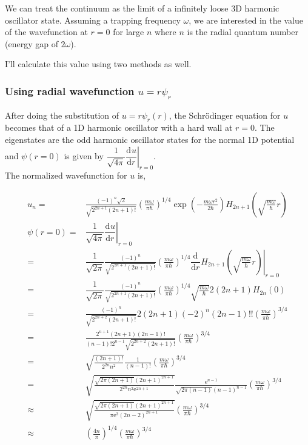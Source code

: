 \documentclass[10pt,fleqn]{article}
\newcommand{\ud}{\mathrm{d}}
\newcommand{\ue}{\mathrm{e}}
\newcommand{\eqar}[1]
{
  \begin{align*}
    #1
  \end{align*}
}
\newcommand{\paren}[1]{{\left({#1}\right)}}
\newcommand{\ddiff}[3][{}]{{\dfrac{\ud^{#1} {#2}}{\ud {#3}{}^{#1}}}}
\begin{document}
We can treat the continuum as the limit of a infinitely loose 3D harmonic oscillator state.
Assuming a trapping frequency $\omega$, we are interested in the value of the wavefunction
at $r=0$ for large $n$ where $n$ is the radial quantum number (energy gap of $2\omega$).

I'll calculate this value using two methods as well.

\subsubsection{Using radial wavefunction $u=r\psi_r$}

After doing the substitution of $u=r\psi_r(r)$, the Schr\"odinger equation for $u$ becomes
that of a 1D harmonic oscillator with a hard wall at $r=0$. The eigenstates are the odd
harmonic oscillator states for the normal 1D potential and $\psi(r=0)$ is given by $\left.\dfrac{1}{\sqrt{4\pi}}\ddiff{u}{r}\right|_{r=0}$.\\

The normalized wavefunction for $u$ is,

\eqar{
  u_n=&\frac{(-1)^n\sqrt{2}}{\sqrt{2^{2n+1}(2n+1)!}}\paren{\frac{m\omega}{\pi\hbar}}^{1/4}\exp\paren{-\frac{m\omega r^2}{2\hbar}}H_{2n+1}\paren{\sqrt{\frac{m\omega}{\hbar}}r}\\
  \psi(r=0)=&\left.\dfrac{1}{\sqrt{4\pi}}\ddiff{u}{r}\right|_{r=0}\\
  =&\dfrac{1}{\sqrt{2\pi}}\frac{(-1)^n}{\sqrt{2^{2n+1}(2n+1)!}}\paren{\frac{m\omega}{\pi\hbar}}^{1/4}
  \left.\ddiff{}{r}H_{2n+1}\paren{\sqrt{\frac{m\omega}{\hbar}}r}\right|_{r=0}\\
  =&\dfrac{1}{\sqrt{2\pi}}\frac{(-1)^n}{\sqrt{2^{2n+1}(2n+1)!}}\paren{\frac{m\omega}{\pi\hbar}}^{1/4}\sqrt{\frac{m\omega}{\hbar}}2(2n + 1) H_{2n}\paren{0}\\
  =&\frac{(-1)^n}{\sqrt{2^{2n+2}(2n+1)!}}2(2n + 1)(-2)^n (2n - 1)!!\paren{\frac{m\omega}{\pi\hbar}}^{3/4}\\
  =&\frac{2^{n+1}(2n + 1) (2n - 1)!}{(n-1)!2^{n-1}\sqrt{2^{2n+2}(2n+1)!}}\paren{\frac{m\omega}{\pi\hbar}}^{3/4}\\
  =&\sqrt{\frac{(2n + 1)!}{2^{2n}n^2}}\frac{1}{(n-1)!}\paren{\frac{m\omega}{\pi\hbar}}^{3/4}\\
  =&\sqrt{\frac{\sqrt{2\pi (2n+1)}(2n+1)^{2n+1}}{2^{2n}n^2\ue^{2n+1}}}\frac{\ue^{n-1}}{\sqrt{2\pi (n-1)}(n-1)^{n-1}}\paren{\frac{m\omega}{\pi\hbar}}^{3/4}\\
  \approx&\sqrt{\frac{\sqrt{2\pi(2n+1)}(2n+1)^{2n+1}}{\pi\ue^{3}(2n-2)^{2n+1}}}\paren{\frac{m\omega}{\pi\hbar}}^{3/4}\\
  \approx&\paren{\frac{4n}{\pi}}^{1/4}\paren{\frac{m\omega}{\pi\hbar}}^{3/4}
}
\end{document}
